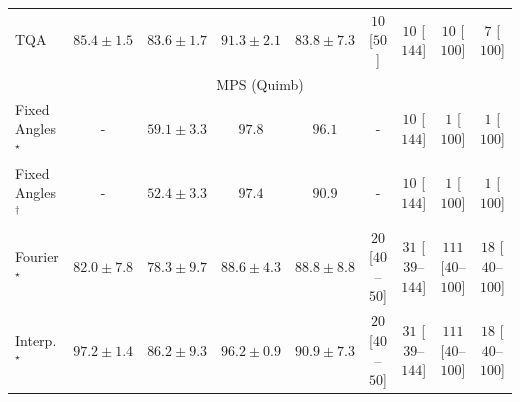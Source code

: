 \begin{tabular}{l|cccc|cccc|}
TQA & {\cellcolor[HTML]{894CA2}} \color[HTML]{F1F1F1} $85.4\pm 1.5$ & {\cellcolor[HTML]{8A59A8}} \color[HTML]{F1F1F1} $83.6\pm 1.7$ & {\cellcolor[HTML]{831A83}} \color[HTML]{F1F1F1} $91.3\pm 2.1$ & {\cellcolor[HTML]{8A58A8}} \color[HTML]{F1F1F1} $83.8\pm 7.3$ & {\cellcolor[HTML]{FFF6F2}} \color[HTML]{000000} $10$ [$50$] & {\cellcolor[HTML]{FFF6F2}} \color[HTML]{000000} $10$ [$144$] & {\cellcolor[HTML]{FFF6F2}} \color[HTML]{000000} $10$ [$100$] & {\cellcolor[HTML]{FFF6F2}} \color[HTML]{000000} $7$ [$100$] \\
\cline{1-9}
\multicolumn{9}{c}{\rule{0pt}{8pt}MPS (Quimb)} \\
\midrule
Fixed Angles$^\star$ & {\cellcolor[HTML]{000000}} \color[HTML]{F1F1F1} {\cellcolor{white}} \color{black} - & {\cellcolor[HTML]{FFF4B5}} \color[HTML]{000000} $59.1\pm 3.3$ & {\cellcolor[HTML]{6B2606}} \color[HTML]{F1F1F1} $97.8$ & {\cellcolor[HTML]{792B05}} \color[HTML]{F1F1F1} $96.1$ & {\cellcolor[HTML]{000000}} \color[HTML]{F1F1F1} {\cellcolor{white}} \color{black} - & {\cellcolor[HTML]{FFF6F2}} \color[HTML]{000000} $10$ [$144$] & {\cellcolor[HTML]{FFF7F3}} \color[HTML]{000000} $1$ [$100$] & {\cellcolor[HTML]{FFF7F3}} \color[HTML]{000000} $1$ [$100$] \\
Fixed Angles$^\dagger$ & {\cellcolor[HTML]{000000}} \color[HTML]{F1F1F1} {\cellcolor{white}} \color{black} - & {\cellcolor[HTML]{FFFFE5}} \color[HTML]{000000} $52.4\pm 3.3$ & {\cellcolor[HTML]{6E2706}} \color[HTML]{F1F1F1} $97.4$ & {\cellcolor[HTML]{A83B03}} \color[HTML]{F1F1F1} $90.9$ & {\cellcolor[HTML]{000000}} \color[HTML]{F1F1F1} {\cellcolor{white}} \color{black} - & {\cellcolor[HTML]{FFF6F2}} \color[HTML]{000000} $10$ [$144$] & {\cellcolor[HTML]{FFF7F3}} \color[HTML]{000000} $1$ [$100$] & {\cellcolor[HTML]{FFF7F3}} \color[HTML]{000000} $1$ [$100$] \\
Fourier$^\star$ & {\cellcolor[HTML]{E76B11}} \color[HTML]{F1F1F1} $82.0\pm 7.8$ & {\cellcolor[HTML]{F5841E}} \color[HTML]{F1F1F1} $78.3\pm 9.7$ & {\cellcolor[HTML]{BC4503}} \color[HTML]{F1F1F1} $88.6\pm 4.3$ & {\cellcolor[HTML]{BB4403}} \color[HTML]{F1F1F1} $88.8\pm 8.8$ & {\cellcolor[HTML]{FFF3EF}} \color[HTML]{000000} $20$ [$40$--$50$] & {\cellcolor[HTML]{FEF1ED}} \color[HTML]{000000} $31$ [$39$--$144$] & {\cellcolor[HTML]{FDDDD9}} \color[HTML]{000000} $111$ [$40$--$100$] & {\cellcolor[HTML]{FFF3F0}} \color[HTML]{000000} $18$ [$40$--$100$] \\
Interp.$^\star$ & {\cellcolor[HTML]{702806}} \color[HTML]{F1F1F1} $97.2\pm 1.4$ & {\cellcolor[HTML]{CF5004}} \color[HTML]{F1F1F1} $86.2\pm 9.3$ & {\cellcolor[HTML]{792B05}} \color[HTML]{F1F1F1} $96.2\pm 0.9$ & {\cellcolor[HTML]{A83B03}} \color[HTML]{F1F1F1} $90.9\pm 7.3$ & {\cellcolor[HTML]{FFF3EF}} \color[HTML]{000000} $20$ [$40$--$50$] & {\cellcolor[HTML]{FEF1ED}} \color[HTML]{000000} $31$ [$39$--$144$] & {\cellcolor[HTML]{FDDDD9}} \color[HTML]{000000} $111$ [$40$--$100$] & {\cellcolor[HTML]{FFF3F0}} \color[HTML]{000000} $18$ [$40$--$100$] \\

\end{tabular}
